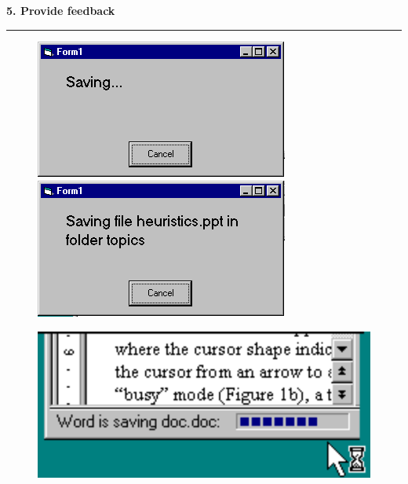 \documentclass[pdf]{beamer}
\begin{document}
\begin{frame}
{\textbf{5. Provide feedback}}{\textcolor{red}{\rule{12cm}{1.2pt}}}


\begin{figure}[H]  
  \begin{minipage}[b]{0.4\linewidth}
    \includegraphics[width=1\linewidth]{26_picture1.png} 
    
  \end{minipage} 
  \begin{minipage}[b]{0.4\linewidth}
    \includegraphics[width=1\linewidth]{26_picture2.png} 
   
  \end{minipage} 
  \end{figure}
  \begin{figure}[H]  
 
  \begin{minipage}[b]{0.5\linewidth}
    \includegraphics[width=1\linewidth]{26_picture3.png} 
   

\end{minipage}
\end{figure}
\end{frame}
\end{document}
